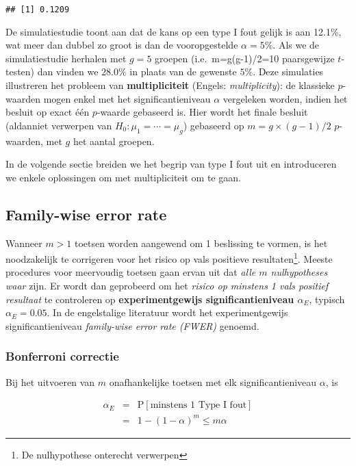 \documentclass[12pt,dutch,coursenotes]{book}
\let\rmarkdownfootnote\footnote%
\def\footnote{\protect\rmarkdownfootnote}
\theoremstyle{definition}
\theoremstyle{definition}
\theoremstyle{definition}
\theoremstyle{remark}
\begin{document}
\begin{verbatim}
## [1] 0.1209
\end{verbatim}

De simulatiestudie toont aan dat de kans op een type I fout gelijk is
aan 12.1\%, wat meer dan dubbel zo groot is dan de vooropgestelde
\(\alpha=5\%\). Als we de simulatiestudie herhalen met \(g=5\) groepen
(i.e.~m=g(g-1)/2=10 paarsgewijze \(t\)-testen) dan vinden we \(28.0\%\)
in plaats van de gewenste \(5\%\). Deze simulaties illustreren het
probleem van \textbf{multipliciteit} (Engels: \emph{multiplicity}): de
klassieke \(p\)-waarden mogen enkel met het significantieniveau
\(\alpha\) vergeleken worden, indien het besluit op exact één
\(p\)-waarde gebaseerd is. Hier wordt het finale besluit (aldanniet
verwerpen van \(H_0: \mu_1=\cdots =\mu_g\)) gebaseerd op
\(m=g\times(g-1)/2\) \(p\)-waarden, met \(g\) het aantal groepen.

In de volgende sectie breiden we het begrip van type I fout uit en
introduceren we enkele oplossingen om met multipliciteit om te gaan.

\subsection{Family-wise error rate}\label{family-wise-error-rate}

Wanneer \(m>1\) toetsen worden aangewend om 1 beslissing te vormen, is
het noodzakelijk te corrigeren voor het risico op vals positieve
resultaten\footnote{De nulhypothese onterecht verwerpen}. Meeste
procedures voor meervoudig toetsen gaan ervan uit dat \emph{alle \(m\)
nulhypotheses waar} zijn. Er wordt dan geprobeerd om het \emph{risico op
minstens 1 vals positief resultaat} te controleren op
\textbf{experimentgewijs significantieniveau \(\alpha_E\)}, typisch
\(\alpha_E=0.05\). In de engelstalige literatuur wordt het
experimentgewijs significantieniveau \emph{family-wise error rate
(FWER)} genoemd.

\subsubsection{Bonferroni correctie}\label{bonferroni-correctie}

Bij het uitvoeren van \(m\) onafhankelijke toetsen met elk
significantieniveau \(\alpha\), is

\begin{eqnarray*}
\alpha_E&=&\text{P}[\text{minstens 1 Type I fout}]\\
&=&1-(1-\alpha)^m \leq m\alpha
\end{eqnarray*}
\end{document}

